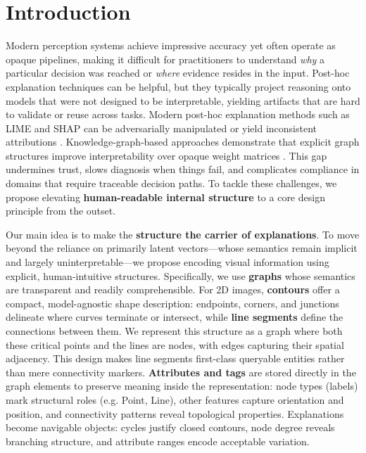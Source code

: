 \documentclass[runningheads]{llncs}
\begin{document}
\section{Introduction}

Modern perception systems achieve impressive accuracy yet often operate as opaque pipelines, making it difficult for practitioners to understand \textit{why} a particular decision was reached or \textit{where} evidence resides in the input. Post-hoc explanation techniques can be helpful, but they typically project reasoning onto models that were not designed to be interpretable, yielding artifacts that are hard to validate or reuse across tasks. Modern post-hoc explanation methods such as LIME and SHAP can be adversarially manipulated or yield inconsistent attributions \cite{ribeiro2016should,slack2020foolinglimeshapadversarial,hooshyar2024problems}. Knowledge-graph‐based approaches demonstrate that explicit graph structures improve interpretability over opaque weight matrices \cite{rajabi2024knowledge}. This gap undermines trust, slows diagnosis when things fail, and complicates compliance in domains that require traceable decision paths. To tackle these challenges, we propose elevating \textbf{human-readable internal structure} to a core design principle from the outset.

Our main idea is to make the \textbf{structure the carrier of explanations}. To move beyond the reliance on primarily latent vectors—whose semantics remain implicit and largely uninterpretable—we propose encoding visual information using explicit, human-intuitive structures. Specifically, we use \textbf{graphs} whose semantics are transparent and readily comprehensible. For 2D images, \textbf{contours} offer a compact, model-agnostic shape description: endpoints, corners, and junctions delineate where curves terminate or intersect, while \textbf{line segments} define the connections between them. We represent this structure as a graph where both these critical points and the lines are nodes, with edges capturing their spatial adjacency. This design makes line segments first-class queryable entities rather than mere connectivity markers. \textbf{Attributes and tags} are stored directly in the graph elements to preserve meaning inside the representation: node types (labels) mark structural roles (e.g. Point, Line), other features capture orientation and position, and connectivity patterns reveal topological properties. Explanations become navigable objects: cycles justify closed contours, node degree reveals branching structure, and attribute ranges encode acceptable variation.
\end{document}
